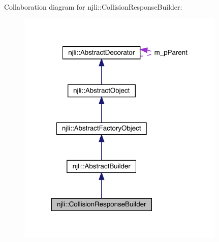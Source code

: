 Collaboration diagram for njli\+:\+:Collision\+Response\+Builder\+:\nopagebreak
\begin{figure}[H]
\begin{center}
\leavevmode
\includegraphics[width=281pt]{classnjli_1_1_collision_response_builder__coll__graph}
\end{center}
\end{figure}
